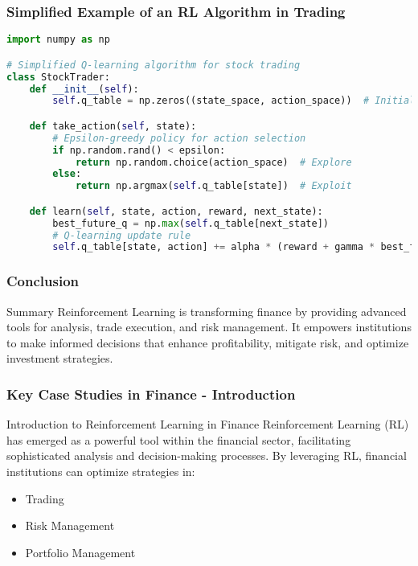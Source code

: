 \documentclass[aspectratio=169]{beamer}
\begin{document}
\begin{frame}[fragile]
    \frametitle{Simplified Example of an RL Algorithm in Trading}
    \begin{lstlisting}[language=Python]
import numpy as np

# Simplified Q-learning algorithm for stock trading
class StockTrader:
    def __init__(self):
        self.q_table = np.zeros((state_space, action_space))  # Initialize Q-table with zeros

    def take_action(self, state):
        # Epsilon-greedy policy for action selection
        if np.random.rand() < epsilon:
            return np.random.choice(action_space)  # Explore
        else:
            return np.argmax(self.q_table[state])  # Exploit

    def learn(self, state, action, reward, next_state):
        best_future_q = np.max(self.q_table[next_state])
        # Q-learning update rule
        self.q_table[state, action] += alpha * (reward + gamma * best_future_q - self.q_table[state, action])
    \end{lstlisting}
\end{frame}

\begin{frame}
    \frametitle{Conclusion}
    \begin{block}{Summary}
        Reinforcement Learning is transforming finance by providing advanced tools for analysis, trade execution, and risk management. It empowers institutions to make informed decisions that enhance profitability, mitigate risk, and optimize investment strategies.
    \end{block}
\end{frame}

\begin{frame}[fragile]
    \frametitle{Key Case Studies in Finance - Introduction}
    \begin{block}{Introduction to Reinforcement Learning in Finance}
        Reinforcement Learning (RL) has emerged as a powerful tool within the financial sector, facilitating sophisticated analysis and decision-making processes. By leveraging RL, financial institutions can optimize strategies in:
        \begin{itemize}
            \item Trading
            \item Risk Management
            \item Portfolio Management
        \end{itemize}
    \end{block}
\end{frame}
\end{document}
